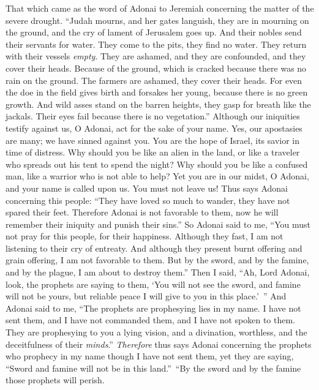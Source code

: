 \begin{biblechapter} %
 That which came as the word of Adonai to Jeremiah concerning the matter of the severe drought.
\verse “Judah mourns, and her gates languish, 
they are in mourning on the ground, 
and the cry of lament of Jerusalem goes up.
\verse And their nobles send their servants for water. 
They come to the pits, they find no water. 
They return with their vessels \textit{empty}. 
They are ashamed, and they are confounded, 
and they cover their heads.
\verse Because of the ground, which is cracked 
because there was no rain on the ground. 
The farmers are ashamed, 
they cover their heads.
\verse For even the doe in the field gives birth and forsakes her young, 
because there is no green growth.
\verse And wild asses stand on the barren heights, 
they gasp for breath like the jackals. 
Their eyes fail 
because there is no vegetation.”
\verse Although our iniquities testify against us, O Adonai, 
act for the sake of your name. 
Yes, our apostasies are many; 
we have sinned against you.
\verse You are the hope of Israel, 
its savior in time of distress. 
Why should you be like an alien in the land, 
or like a traveler who spreads out his tent  to spend the night?
\verse Why should you be like a confused man, 
like a warrior who is not able to help? 
Yet you are in our midst, O Adonai, 
and your name is called upon us. 
You must not leave us!
\verse Thus says Adonai concerning this people: “They have loved so much to wander, 
they have not spared their feet. 
Therefore Adonai is not favorable to them, 
now he will remember their iniquity and punish their sins.”
 So Adonai said to me, “You must not pray for this people, for their happiness.
\verse Although they fast, I am not listening to their cry of entreaty. And although they present burnt offering and grain offering, I am not favorable to them. But by the sword, and by the famine, and by the plague, I am about to destroy them.”
\verse Then I said, “Ah, Lord Adonai, look, the prophets are saying to them, ‘You will not see the sword, and famine will not be yours, but reliable peace I will give to you in this place.’ ”
\verse And Adonai said to me, “The prophets are prophesying lies in my name. I have not sent them, and I have not commanded them, and I have not spoken to them. They are prophesying to you a lying vision, and a divination, worthless, and the deceitfulness of their \textit{minds}.”
\verse \textit{Therefore} thus says Adonai concerning the prophets who prophecy in my name though I have not sent them, yet they are saying, “Sword and famine will not be in this land.” “By the sword and by the famine those prophets will perish.

\end{biblechapter}
